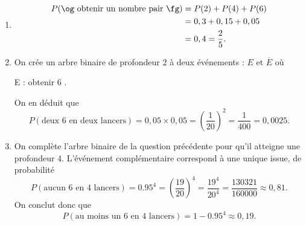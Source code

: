 {	\begin{enumerate}
		\item 
			\begin{align*}
				P(\text{\og obtenir un nombre pair \fg}) &= P(2) + P(4) + P(6) \\
				&= 0,3 + 0,15 + 0,05 \\
				&= 0,4 = \frac25.
			\end{align*}
		\item
			On crée un arbre binaire de profondeur $2$ à deux événements : $E$ et $\overline{E}$ où
				\begin{center}
					E : \og obtenir $6$ \fg.
				\end{center}
			On en déduit que
			\[ P(\text{deux $6$ en deux lancers}) = 0,05 \times 0,05 = \left(\dfrac1{20}\right)^2 = \dfrac1{400} = 0,0025. \]
		\item
			On complète l'arbre binaire de la question précédente pour qu'il atteigne une profondeur $4$.
			L'événement complémentaire correspond à une unique issue, de probabilité
				\[ P(\text{aucun $6$ en $4$ lancers}) = 0.95^4 = \left(\dfrac{19}{20}\right)^4 = \dfrac{19^4}{20^4} = \dfrac{130321}{160000} \approx 0,81. \]
			On conclut donc que
				\[ P(\text{au moins un $6$ en $4$ lancers}) = 1-0.95^4 \approx 0,19. \]
				
	\end{enumerate}
}


